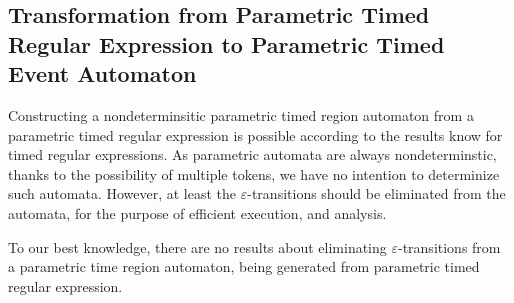 	\subsection{Transformation from Parametric Timed Regular Expression to Parametric Timed Event Automaton}


	Constructing a nondeterminsitic parametric timed region automaton from a parametric timed regular expression is possible according to the results know for timed regular expressions. As parametric automata are always nondeterminstic, thanks to the possibility of multiple tokens, we have no intention to determinize such automata.
	However, at least the $\varepsilon$-transitions should be eliminated from the automata, for the purpose of efficient execution, and analysis.
	
	To our best knowledge, there are no results about eliminating $\varepsilon$-transitions from a parametric time region automaton, being generated from parametric timed regular expression.
	


			

	
	